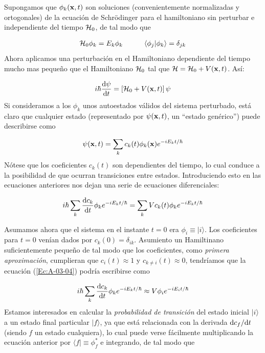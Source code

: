 Supongamos que $\phi_k (\mathbf{x},t)$ son soluciones (convenientemente normalizadas y ortogonales) de la ecuación de Schrödinger para el hamiltoniano sin perturbar e independiente del tiempo $\mathcal{H}_0$, de tal modo que

\begin{eqnarray}
	\mathcal{H}_0 \phi_k = E_k \phi_k \quad \quad \quad \langle \phi_j |\phi_k \rangle = \delta_{jk}
\end{eqnarray}
Ahora aplicamos una perturbación en el Hamiltoniano dependiente del tiempo mucho mas pequeño que el Hamiltoniano $\mathcal{H}_0$ tal que $\mathcal{H}=\mathcal{H}_0 + V(\mathbf{x},t)$. Así:

\begin{eqnarray}
	i \hbar \frac{\mathrm{d} \psi}{\mathrm{d} t} = \left[ \mathcal{H}_0 + V(\mathbf{x},t) \right]\psi
\end{eqnarray}
Si consideramos a los $\phi_k$ unos autoestados válidos del sistema perturbado, está claro que cualquier estado (representado por $\psi(\mathbf{x},t)$, un ``estado genérico'') puede describirse como 

\begin{eqnarray}
	\psi(\mathbf{x},t) = \sum_k c_k(t) \phi_k (\mathbf{x}) e^{-iE_kt/\hbar}
\end{eqnarray}
Nótese que los coeficientes $c_k(t)$ son dependientes del tiempo, lo cual conduce a la posibilidad de que ocurran transiciones entre estados. Introduciendo esto en las ecuaciones anteriores nos dejan una serie de ecuaciones diferenciales:

\begin{eqnarray}
	i \hbar \sum_k \frac{\mathrm{d} c_k}{\mathrm{d} t} \phi_k e^{-iE_k t/\hbar} = \sum_k Vc_k (t) \phi_k e^{-iE_kt/\hbar} \label{Ec:A-03-04}
\end{eqnarray}

Asumamos ahora que el sistema en el instante $t=0$ era $\phi_i \equiv |i\rangle$. Los coeficientes para $t=0$ venían dados por $c_k (0)=\delta_{ik}$. Asumiento un Hamiltinano suficientemente pequeño de tal modo que los coeficientes, como \textit{primera aproximación}, cumplieran que $c_i(t)\approx 1$ y $c_{k\neq i}(t) \approx 0$, tendríamos que la ecuación (\ref{Ec:A-03-04}) podría escribirse como

\begin{eqnarray}
	i \hbar \sum_k \frac{\mathrm{d} c_k}{\mathrm{d} t} \phi_k e^{-iE_kt/\hbar} \approx V\phi_i e^{-iE_it/\hbar}
\end{eqnarray}
Estamos interesados en calcular la \textit{probabilidad de transición} del estado inicial $|i\rangle$ a un estado final particular $|f\rangle$, ya que está relacionada con la derivada $\mathrm{d} c_f / \mathrm{d} t$ (siendo $f$ un estado cualquiera), lo cual puede verse fácilmente multiplicando la ecuación anterior por $\langle f | \equiv \phi_f^*$ e integrando, de tal modo que

